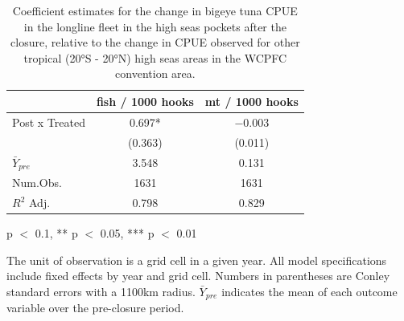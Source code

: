 \begin{table}
\centering
\begin{threeparttable}
\caption{\label{tab:h2}Coefficient estimates for the change in bigeye
             tuna CPUE in the longline fleet in the high seas pockets after
             the closure, relative to the change in CPUE observed for other tropical
             (20°S - 20°N) high seas areas in the WCPFC convention area.}
\centering
\begin{tabular}[t]{lcc}
\toprule
  & fish / 1000 hooks & mt / 1000 hooks\\
\midrule
Post x Treated & \num{0.697}* & \num{-0.003}\\
 & (\num{0.363}) & (\num{0.011})\\
$\bar{Y}_{pre}$ & \num{3.548} & \num{0.131}\\
\midrule
Num.Obs. & \num{1631} & \num{1631}\\
$R^2$ Adj. & \num{0.798} & \num{0.829}\\
\bottomrule
\end{tabular}
\begin{tablenotes}
\small
\item * p $<$ 0.1, ** p $<$ 0.05, *** p $<$ 0.01
\item The unit of observation is a grid cell in a given year. All model specifications include fixed effects by year and grid cell. Numbers in parentheses are Conley standard errors with a 1100km radius. $\bar{Y}_{pre}$ indicates the mean of each outcome variable over the pre-closure period.
\end{tablenotes}
\end{threeparttable}
\end{table}
